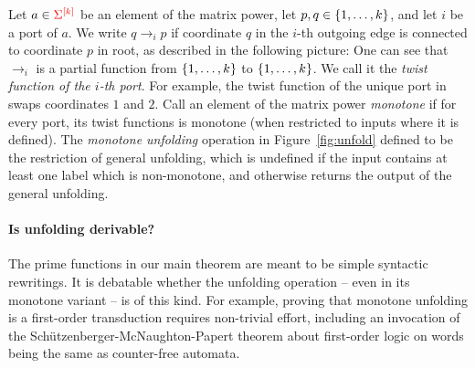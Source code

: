  Let  $a \in {\color{red}{\Sigma}}^{{\color{red}{[k]}}}$ be an element of the matrix power,  let $p,q \in \{1,\ldots,k\}$, and let  $i$ be a port of $a$. We write $
     q \to_i p$
if coordinate $q$ in the $i$-th outgoing edge  is connected to  coordinate $p$ in root, as described in the following picture:
One can see that $\to_i$ is a partial function from $\{1,\ldots,k\}$ to $\{1,\ldots,k\}$. We call it the  \emph{twist function of the $i$-th port}. For example, the twist function  of the unique port in 
swaps coordinates $1$ and $2$.  Call  an element of the matrix power  \emph{monotone} if for every port, its twist functions is monotone (when restricted to inputs where it is defined). The \emph{monotone unfolding} operation in Figure~\ref{fig:unfold} defined to be the restriction of general unfolding,  which  is undefined if the input contains at least one label which is non-monotone, and otherwise returns the output of the general unfolding.

\paragraph*{Is unfolding derivable?} The  prime functions in our main theorem  are meant to be simple syntactic rewritings. It is debatable whether the  unfolding operation -- even in its monotone variant -- is of this kind. For example, proving that monotone unfolding is a first-order transduction requires non-trivial effort, including an invocation of the Sch\"utzenberger-McNaughton-Papert theorem about first-order logic on words being the same as counter-free automata. 

